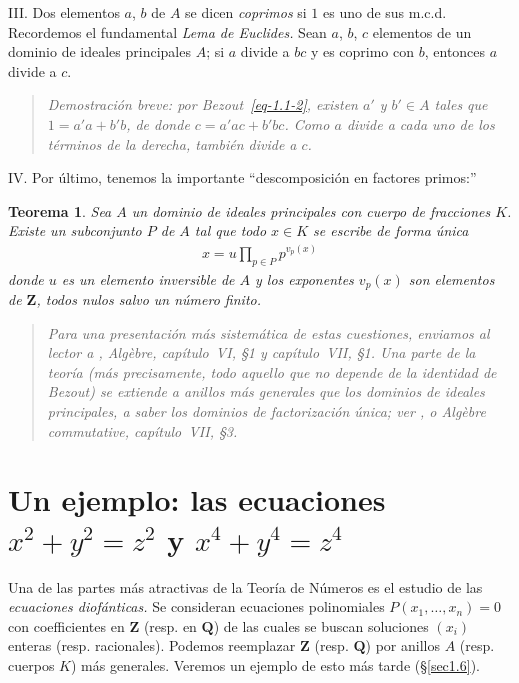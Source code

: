\documentclass[bibtotoc,leqno,spanish]{amsbook}
\newcommand{\QQ}{\mathbf{Q}}
\newcommand{\ZZ}{\mathbf{Z}}
\numberwithin{equation}{section}
\newenvironment{comm}%
	{\begin{quotation}\itshape\Small}
	{\end{quotation}}
\theoremstyle{note}
\theoremstyle{note}
\newtheorem*{theorem*}{Teorema}
\theoremstyle{rem}
\numberwithin{theorem}{section}
\numberwithin{proposition}{section}
\numberwithin{definition}{section}
\numberwithin{lemma}{section}
\numberwithin{corollary}{section}
\numberwithin{example}{section}
\numberwithin{footnote}{section}%
\begin{document}
\begin{trivlist}
\item {III.} Dos elementos $a$, $b$ de $A$ se dicen {\em coprimos} si $1$ es uno de sus
m.c.d. Recordemos el fundamental \emph{Lema de Euclides.} Sean $a$, $b$, $c$
elementos de un dominio de ideales principales $A$; si $a$ divide a $bc$ y es
coprimo con $b$, entonces $a$ divide a $c$.

\begin{comm}
Demostraci\'on breve: por Bezout~\eqref{eq-1.1-2}, existen $a'$ y $b'\in A$
tales que $1 = a'a+b'b$, de donde $c = a'ac+b'bc$. Como $a$ divide a cada uno de los
t\'erminos de la derecha, tambi\'en divide a $c$.
\end{comm}

\item {IV.} Por \'ultimo, tenemos la importante ``descomposici\'on en factores primos:''
\begin{theorem*}
Sea $A$ un dominio de ideales principales con cuerpo de fracciones $K$. Existe
un subconjunto $P$ de $A$ tal que todo $x\in K$ se escribe de forma \'unica
\begin{gather}
x = u\prod_{p\in P}p^{v_{p}(x)}
\end{gather}
donde $u$ es un elemento inversible de $A$ y los exponentes $v_{p}(x)$ son
elementos de $\ZZ$, todos nulos salvo un n\'umero finito.
\end{theorem*}
\end{trivlist}

\begin{comm}
Para una presentaci\'on m\'as sistem\'atica de estas cuestiones, enviamos al lector
a \cite{Bourbaki1}, {\itshape Alg\`ebre,} cap\'itulo~VI, \S1 y cap\'itulo~VII, \S1.
Una parte de la teor\'ia (m\'as precisamente, todo aquello que no depende de la identidad de Bezout)
se extiende a anillos m\'as generales que los dominios de ideales principales, a saber
los {\em dominios de factorizaci\'on \'unica;} ver \cite{Samuel2}, o \cite{Bourbaki2} Alg\`ebre
commutative, cap\'itulo~VII, \S3.
\end{comm}

\section{Un ejemplo: las ecuaciones $x^{2}+y^{2}=z^{2}$ y $x^{4}+y^{4}=z^{4}$}\label{sec1.2}

Una de las partes m\'as atractivas de la Teor\'ia de N\'umeros es el estudio de
las {\em ecuaciones diof\'anticas.} Se consideran ecuaciones polinomiales
$P(x_{1},\dots,x_{n}) = 0$ con coefficientes en $\ZZ$ (resp. en $\QQ$) de las cuales
se buscan soluciones $(x_{i})$ enteras (resp. racionales). Podemos reemplazar $\ZZ$
(resp. $\QQ$) por anillos $A$ (resp. cuerpos $K$) m\'as generales. Veremos un
ejemplo de esto m\'as tarde (\S\ref{sec1.6}).
\end{document}
